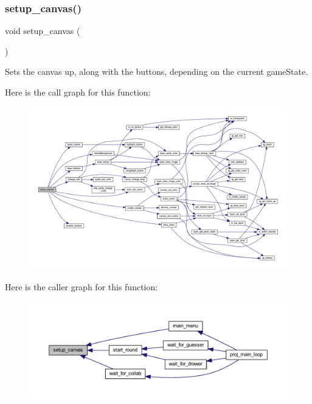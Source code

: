 \subsubsection{\texorpdfstring{setup\+\_\+canvas()}{setup\_canvas()}}
{\footnotesize\ttfamily void setup\+\_\+canvas (\begin{DoxyParamCaption}{ }\end{DoxyParamCaption})}



Sets the canvas up, along with the buttons, depending on the current game\+State. 

Here is the call graph for this function\+:\nopagebreak
\begin{figure}[H]
\begin{center}
\leavevmode
\includegraphics[width=350pt]{group__pengoo_ga4de72e6fe25e96efa9d419d420f34fcb_cgraph}
\end{center}
\end{figure}
Here is the caller graph for this function\+:\nopagebreak
\begin{figure}[H]
\begin{center}
\leavevmode
\includegraphics[width=350pt]{group__pengoo_ga4de72e6fe25e96efa9d419d420f34fcb_icgraph}
\end{center}
\end{figure}
\mbox{\label{group__pengoo_ga02cb99bd23a1083281e874b3b4ebbad5}} 
